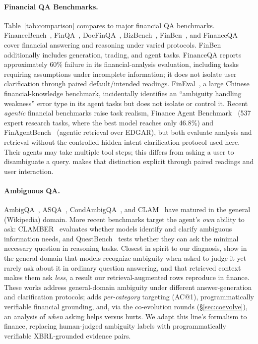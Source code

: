 \paragraph{Financial QA Benchmarks.}
Table~\ref{tab:comparison} compares \fininteract to major financial QA
benchmarks.
FinanceBench~\citep{islam2023financebench},
FinQA~\citep{chen2021finqa},
DocFinQA~\citep{reddy2024docfinqa},
BizBench~\citep{krumdick2024bizbench},
FinBen~\citep{xie2024finben}, and
FinanceQA~\citep{mateega2025financeqa}
cover financial answering and reasoning under varied protocols. FinBen additionally includes generation, trading, and agent tasks. FinanceQA reports approximately 60\% failure in its financial-analysis evaluation, including tasks requiring assumptions under incomplete information; it does not isolate user clarification through paired default/intended readings.
FinEval~\citep{guo2023fineval}, a large Chinese financial-knowledge benchmark,
incidentally identifies an ``ambiguity handling weakness'' error type in its
agent tasks but does not isolate or control it. Recent \emph{agentic} financial
benchmarks raise task realism, Finance Agent Benchmark~\citep{bigeard2025financeagent}
(537 expert research tasks, where the best model reaches only 46.8\%) and
FinAgentBench~\citep{choi2025finagentbench} (agentic retrieval over EDGAR), but both
evaluate analysis and retrieval without the controlled hidden-intent clarification protocol used here. Their agents may take multiple tool steps; this differs from asking a user to disambiguate a query. \fininteract makes that distinction explicit through paired readings and user interaction.



\paragraph{Ambiguous QA.}
AmbigQA~\citep{min2020ambigqa},
ASQA~\citep{stelmakh2022asqa},
CondAmbigQA~\citep{li2025condambigqa}, and
CLAM~\citep{kuhn2022clam}
have matured in the general (Wikipedia) domain.
More recent benchmarks target the agent's \emph{own} ability to ask:
CLAMBER~\citep{zhang2024clamber} evaluates whether models identify and clarify
ambiguous information needs, and QuestBench~\citep{li2025questbench} tests whether
they can ask the minimal necessary question in reasoning tasks. Closest in spirit to our
diagnosis, \citet{su2026knowing} show in the general domain that models recognize ambiguity when
asked to judge it yet rarely ask about it in ordinary question answering, and that retrieved
context makes them ask \emph{less}, a result our retrieval-augmented rows reproduce in finance.
These works address general-domain ambiguity under different answer-generation and clarification protocols; \fininteract adds \emph{per-category}
targeting (AC@1), programmatically verifiable financial grounding, and, via the
co-evolution rounds (\S\ref{sec:coevolve}), an analysis of \emph{when} asking helps
versus hurts. We adapt this line's formalism to finance, replacing human-judged
ambiguity labels with programmatically verifiable XBRL-grounded evidence pairs.

